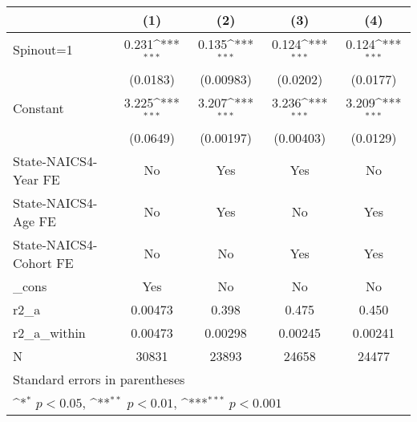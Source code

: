 {
\def\sym#1{\ifmmode^{#1}\else\(^{#1}\)\fi}
\begin{tabular}{l*{4}{c}}
\hline\hline
                    &\multicolumn{1}{c}{(1)}         &\multicolumn{1}{c}{(2)}         &\multicolumn{1}{c}{(3)}         &\multicolumn{1}{c}{(4)}         \\
\hline
Spinout=1           &       0.231\sym{***}&       0.135\sym{***}&       0.124\sym{***}&       0.124\sym{***}\\
                    &    (0.0183)         &   (0.00983)         &    (0.0202)         &    (0.0177)         \\
[1em]
Constant            &       3.225\sym{***}&       3.207\sym{***}&       3.236\sym{***}&       3.209\sym{***}\\
                    &    (0.0649)         &   (0.00197)         &   (0.00403)         &    (0.0129)         \\
[1em]
State-NAICS4-Year FE&          No         &         Yes         &         Yes         &          No         \\
[1em]
State-NAICS4-Age FE &          No         &         Yes         &          No         &         Yes         \\
[1em]
State-NAICS4-Cohort FE&          No         &          No         &         Yes         &         Yes         \\
[1em]
\_cons              &         Yes         &          No         &          No         &          No         \\
\hline
r2\_a                &     0.00473         &       0.398         &       0.475         &       0.450         \\
r2\_a\_within         &     0.00473         &     0.00298         &     0.00245         &     0.00241         \\
N                   &       30831         &       23893         &       24658         &       24477         \\
\hline\hline
\multicolumn{5}{l}{\footnotesize Standard errors in parentheses}\\
\multicolumn{5}{l}{\footnotesize \sym{*} \(p<0.05\), \sym{**} \(p<0.01\), \sym{***} \(p<0.001\)}\\
\end{tabular}
}
